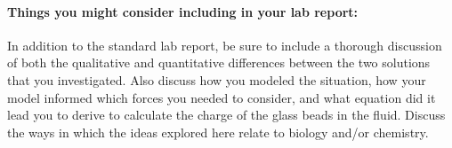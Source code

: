 \paragraph*{Things you might consider including in your lab report:} In addition to the standard lab report, be sure to include a thorough discussion of both the qualitative and quantitative differences between the two solutions that you investigated.
Also discuss how you modeled the situation, how your model informed which forces you needed to consider, and what equation did it lead you to derive to calculate the charge of the glass beads in the fluid.
Discuss the ways in which the ideas explored here relate to biology and/or chemistry.
